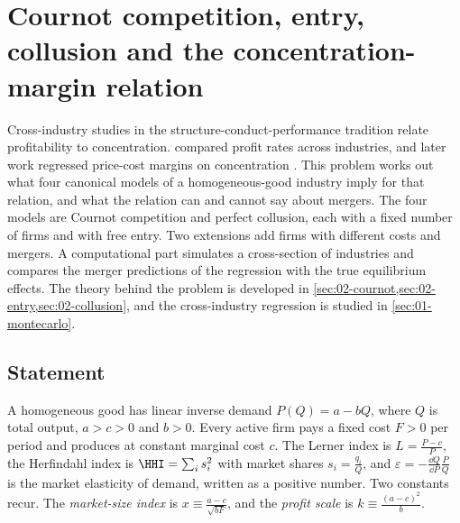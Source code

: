 \section{Cournot competition, entry, collusion and the concentration-margin relation}\label{sec:C-cournot}

Cross-industry studies in the structure-conduct-performance tradition relate profitability to
concentration. \citet{Bain1951} compared profit rates across industries, and later work regressed price-cost
margins on concentration \citep{Schmalensee1989}. This problem works out what four canonical models of a homogeneous-good
industry imply for that relation, and what the relation can and cannot say about mergers. The four models
are Cournot competition and perfect collusion, each with a fixed number of firms and with free entry. Two
extensions add firms with different costs and mergers. A computational part simulates a cross-section of
industries and compares the merger predictions of the regression with the true equilibrium effects. The
theory behind the problem is developed in \cref{sec:02-cournot,sec:02-entry,sec:02-collusion}, and the
cross-industry regression is studied in \cref{sec:01-montecarlo}.

\subsection{Statement}\label{sec:C-cournot-statement}

A homogeneous good has linear inverse demand $P(Q) = a - bQ$, where $Q$ is total output, $a > c > 0$ and
$b > 0$. Every active firm pays a fixed cost $F > 0$ per period and produces at constant marginal cost $c$. The
Lerner index is $L = \frac{P - c}{P}$, the Herfindahl index is $\HHI = \sum_i s_i^2$ with market shares
$s_i = \frac{q_i}{Q}$, and $\varepsilon = -\frac{\dd Q}{\dd P}\frac{P}{Q}$ is the market elasticity of demand,
written as a positive number. Two constants recur. The \emph{market-size index} is
$x \equiv \frac{a - c}{\sqrt{bF}}$, and the \emph{profit scale} is $k \equiv \frac{(a - c)^2}{b}$.

